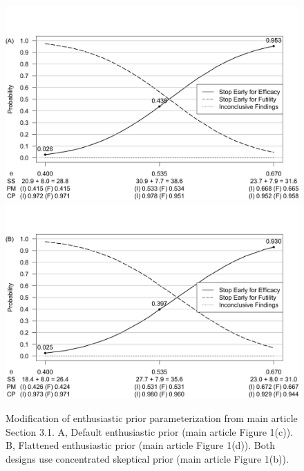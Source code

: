 \documentclass[useAMS,usenatbib,referee]{biom}
\begin{document}
\begin{figure}\begin{center}

 \includegraphics[width=6in]{figureS2a.png}
 \includegraphics[width=6in]{figureS2b.png}
 \caption{Modification of enthusiastic prior parameterization from main article Section 3.1. A, Default enthusiastic prior (main article Figure 1(c)). B, Flattened enthusiastic prior (main article Figure 1(d)). Both designs use concentrated skeptical prior (main article Figure 1(b)).}
\label{fig:robustness1}
\end{center}
\end{figure}
\end{document}
